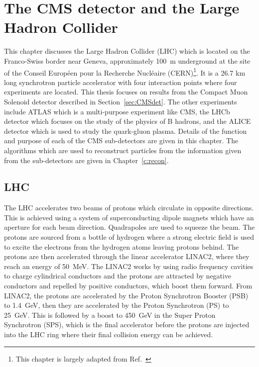 \chapter{The CMS detector and the Large Hadron Collider}
\label{c:det}
This chapter discusses the Large Hadron Collider (LHC) which is located on the Franco-Swiss border near Geneva, approximately 100~m underground at the site of the Conseil Europ\'{e}en pour la Recherche Nucl\'{e}aire (CERN)\footnote{This chapter is largely adapted from Ref.~\cite{iopdetector}}. It is a 26.7 km long synchrotron particle accelerator with four interaction points where four experiments are located. This thesis focuses on results from the Compact Muon Solenoid detector described in Section~\ref{sec:CMSdet}. The other experiments include ATLAS which is a multi-purpose experiment like CMS, the LHCb detector which focuses on the study of the physics of B hadrons, and the ALICE detector which is used to study the quark-gluon plasma. Details of the function and purpose of each of the CMS sub-detectors are given in this chapter. The algorithms which are used to reconstruct particles from the information given from the sub-detectors are given in Chapter~\ref{c:recon}.

\section{LHC}

The LHC accelerates two beams of protons which circulate in opposite directions.
This is achieved using a system of superconducting dipole magnets which have an aperture for each beam direction. Quadrapoles are used to squeeze the beam.
The protons are sourced from a bottle of hydrogen where a strong electric field is used to excite the electrons from the hydrogen atoms leaving protons behind. The protons are then accelerated through the linear accelerator LINAC2, where they reach an energy of 50~MeV. The LINAC2 works by using radio frequency cavities to charge cylindrical conductors and the protons are attracted by negative conductors and repelled by positive conductors, which boost them forward. From LINAC2, the protons are accelerated by the Proton Synchrotron Booster (PSB) to 1.4~GeV, then they are accelerated by the Proton Synchrotron (PS) to 25~GeV. This is followed by a boost to 450~GeV in the Super Proton Synchrotron (SPS), which is the final accelerator before the protons are injected into the LHC ring where their final collision energy can be achieved. 


